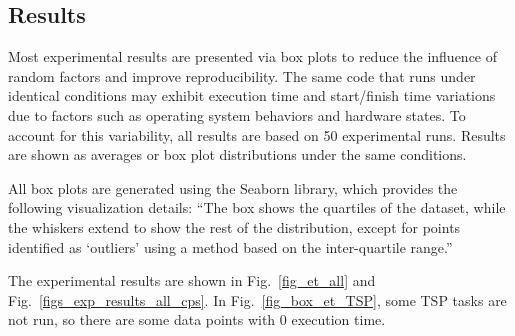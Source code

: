 	
\subsection{Results}
    Most experimental results are presented via box plots to reduce the influence of random factors and improve reproducibility. The same code that runs under identical conditions may exhibit execution time and start/finish time variations due to factors such as operating system behaviors and hardware states. To account for this variability, all results are based on 50 experimental runs. Results are shown as averages or box plot distributions under the same conditions.
    
    All box plots are generated using the Seaborn library, which provides the following visualization details:
    ``The box shows the quartiles of the dataset, while the whiskers extend to show the rest of the distribution, except for points identified as `outliers' using a method based on the inter-quartile range.''
    
    The experimental results are shown in Fig.~\ref{fig_et_all} and Fig.~\ref{figs_exp_results_all_cps}. In Fig.~\ref{fig_box_et_TSP}, some TSP tasks are not run, so there are some data points with 0 execution time. 

